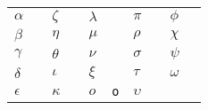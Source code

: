 \documentclass{article}
\newcommand*\s[1]{$#1$&\texttt{\string#1}}
\begin{document}
\begin{tabular}{l@{~}ll@{~}ll@{~}ll@{~}ll@{~}l}
\s\alpha      & \s\zeta   &   \s\lambda  & \s\pi     & \s\phi \\
\s\beta       & \s\eta    &   \s\mu      & \s\rho    &\s\chi \\
\s\gamma      & \s\theta  &   \s\nu      & \s\sigma  &\s\psi\\
\s\delta      & \s\iota   &   \s\xi      & \s\tau    &\s\omega \\
\s\epsilon    & \s\kappa  &   \s o       & \s\upsilon&
\end{tabular}
\end{document}
